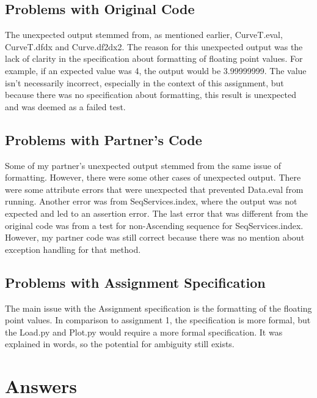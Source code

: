 \documentclass[12pt]{article}
\begin{document}
\subsection{Problems with Original Code}

The unexpected output stemmed from, as mentioned earlier, CurveT.eval, CurveT.dfdx and Curve.df2dx2.
The reason for this unexpected output was the lack of clarity in the specification about formatting
of floating point values. For example, if an expected value was 4, the output would be 3.99999999.
The value isn't necessarily incorrect, especially in the context of this assignment, but because 
there was no specification about formatting, this result is unexpected and was deemed as a failed test.\\

\subsection{Problems with Partner's Code}

Some of my partner's unexpected output stemmed from the same issue of formatting. However, there were 
some other cases of unexpected output. There were some attribute errors that were unexpected that prevented
Data.eval from running. Another error was from SeqServices.index, where the output was not expected and led 
to an assertion error. The last error that was different from the original code was from a test for 
non-Ascending sequence for SeqServices.index. However, my partner code was still correct because there was
no mention about exception handling for that method.\\

\subsection{Problems with Assignment Specification}

The main issue with the Assignment specification is the formatting of the floating point values. In comparison
to assignment 1, the specification is more formal, but the Load.py and Plot.py would require a more formal 
specification. It was explained in words, so the potential for ambiguity still exists. \\

\section{Answers}
\end{document}
